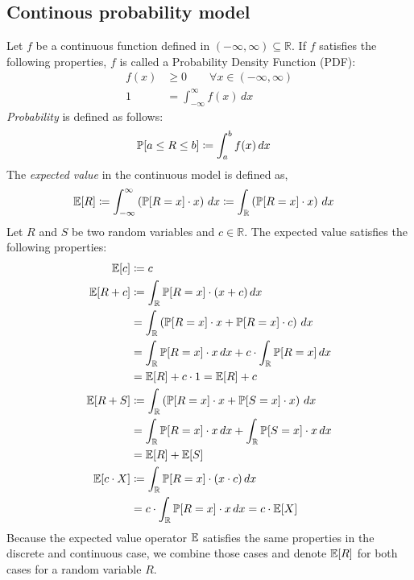 \subsection{Continous probability model}
\label{sec:bp-continuous}
%
Let $f$ be a continuous function defined in $(-\infty, \infty) \subseteq \mathbb R$.
If $f$ satisfies the following properties, $f$ is called a Probability Density Function (PDF):
\begin{align}
  f(x) &\geq 0 \qquad \forall x \in (-\infty, \infty) \\
     1 &= \int_{-\infty}^{\infty} f(x) \, dx
\end{align}
\emph{Probability} is defined as follows:
\begin{align}
  \mathbb P[a \leq R \leq b] &\coloneqq \int_a^b f(x) \, dx
\end{align}
The \emph{expected value} in the continuous model is defined as,
\begin{align}
  \mathbb E[R] &\coloneqq \int_{-\infty}^\infty \left(\mathbb P[R=x] \cdot x\right) \, dx \coloneqq \int_{\mathbb R} \left(\mathbb P[R=x] \cdot x\right) \, dx
\end{align}
%
Let $R$ and $S$ be two random variables and $c \in \mathbb R$.
The expected value satisfies the following properties:
\begin{align}
  \mathbb E[c]     &\coloneqq c \\
  \mathbb E[R + c] &\coloneqq \int_{\mathbb R} \mathbb P[R=x] \cdot (x + c) \, dx \nonumber\\
            &= \int_{\mathbb R} \left(\mathbb P[R=x] \cdot x + \mathbb P[R=x] \cdot c\right) \, dx \nonumber\\
            &= \int_{\mathbb R} \mathbb P[R=x] \cdot x \, dx + c \cdot \int_{\mathbb R} \mathbb P[R=x] \, dx \nonumber\\
            &= \mathbb E[R] + c \cdot 1 = \mathbb E[R] + c \\
  \mathbb E[R + S] &\coloneqq \int_{\mathbb R} \left(\mathbb P[R=x] \cdot x + \mathbb P[S=x] \cdot x\right) \, dx \nonumber\\
            &= \int_{\mathbb R} \mathbb P[R=x] \cdot x \, dx + \int_{\mathbb R} \mathbb P[S=x] \cdot x \, dx \nonumber\\
            &= \mathbb E[R] + \mathbb E[S] \\
  \mathbb E[c \cdot X] &\coloneqq \int_{\mathbb R} \mathbb P[R=x] \cdot (x \cdot c) \, dx \nonumber\\
            &= c \cdot \int_{\mathbb R} \mathbb P[R=x] \cdot x \, dx
            = c \cdot \mathbb E[X]
\end{align}
%
Because the expected value operator $\mathbb E$ satisfies the same properties in the discrete and continuous case,
we combine those cases and denote $\mathbb E[R]$ for both cases for a random variable $R$.

